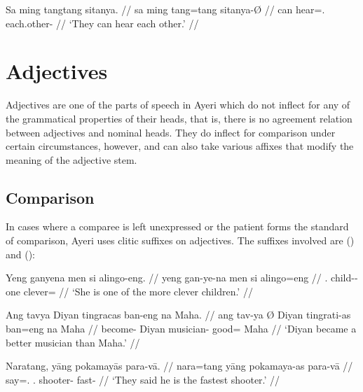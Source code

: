 \a\begingl
	\gla Sa ming tangtang sitanya. //
	\glb sa ming tang=tang sitanya-Ø //
	\glc \PatT{} can hear=\TplM{}.\Aarg{} each.other-\Top{} //
	\glft `They can hear each other.' //
\endgl

\xe


\section{Adjectives}
\label{sec:adjectives}

Adjectives are one of the parts of speech in Ayeri which do not inflect for any
of the grammatical properties of their heads, that is, there is no agreement
relation between adjectives and nominal heads. They do inflect for comparison
under certain circumstances, however, and can also take various affixes that
modify the meaning of the adjective stem.

\subsection{Comparison}
\label{subsec:adjcomp}

In cases where a comparee is left unexpressed or the patient forms the 
standard of comparison, Ayeri uses clitic suffixes on adjectives. The suffixes 
involved are  (\Comp{}) and  (\Supl{}):

\pex\label{ex:sfxcomp}
\a\label{ex:sfxcomp2}\begingl
	\gla Yeng ganyena men si alingo-eng. //
	\glb yeng gan-ye-na men si alingo=eng //
	\glc \TsgF{}.\Aarg{} child-\Pl{}-\Gen{} one \Rel{} clever=\Comp{} //
	\glft `She is one of the more clever children.' //
\endgl

\a\label{ex:sfxcomp1}\begingl
	\gla Ang tavya {} Diyan tingracas ban-eng na Maha. //
	\glb ang tav-ya Ø Diyan tingrati-as ban=eng na Maha //
	\glc \AgtT{} become-\TsgM{} \Top{} Diyan musician-\Parg{} good=\Comp{} 
		\Gen{} Maha //
	\glft `Diyan became a better musician than Maha.' //
\endgl


\a\label{ex:sfxsupl}\begingl
	\gla Naratang, yāng pokamayās para-vā. //
	\glb nara=tang yāng pokamaya-as para-vā //
	\glc say=\TplM{}.\Aarg{} \TsgM.\Aarg{} shooter-\Parg{} fast-\Supl{} //
	\glft `They said he is the fastest shooter.' //
\endgl\xe

